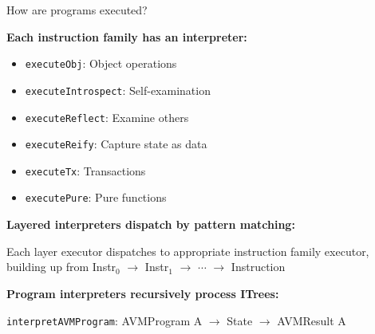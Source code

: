\documentclass[handout,aspectratio=169,xcolor=dvipsnames,10pt]{beamer}
\begin{document}
\begin{frame}{How are programs executed?}

\vfill

\textbf{Each instruction family has an interpreter:}

\vspace{0.3em}

\begin{itemize}\scriptsize
  \item \texttt{executeObj}: Object operations
  \item \texttt{executeIntrospect}: Self-examination
  \item \texttt{executeReflect}: Examine others
  \item \texttt{executeReify}: Capture state as data
  \item \texttt{executeTx}: Transactions
  \item \texttt{executePure}: Pure functions
\end{itemize}

\vspace{0.5em}

\textbf{Layered interpreters dispatch by pattern matching:}

\vspace{0.3em}

Each layer executor dispatches to appropriate instruction family executor, building up from Instr$_0$ $\to$ Instr$_1$ $\to$ $\cdots$ $\to$ Instruction

\vspace{0.5em}

\textbf{Program interpreters recursively process ITrees:}

\vspace{0.3em}

\centering
\texttt{interpretAVMProgram}: AVMProgram A $\to$ State $\to$ AVMResult A

\vfill

\end{frame}

\end{document}
